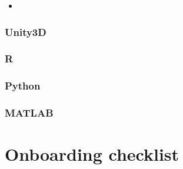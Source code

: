 \documentclass[
  12pt,
]{book}
\providecommand{\tightlist}{%
  \setlength{\itemsep}{0pt}\setlength{\parskip}{0pt}}
\begin{document}
\begin{itemize}
\tightlist
\item
\end{itemize}

\hypertarget{unity3d}{%
\subsection{Unity3D}\label{unity3d}}

\hypertarget{r}{%
\subsection{R}\label{r}}

\hypertarget{python}{%
\subsection{Python}\label{python}}

\hypertarget{matlab}{%
\subsection{MATLAB}\label{matlab}}

\hypertarget{onboarding}{%
\chapter{Onboarding checklist}\label{onboarding}}

  
\end{document}
